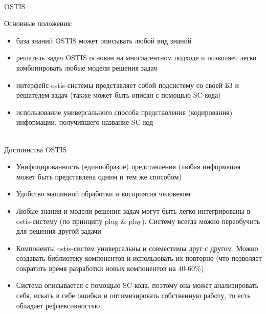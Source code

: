 \begin{frame}{\\OSTIS}
	\vspace{10mm}
	\begin{SCn}
	\vspace{3mm}
	Основные положения:
		\begin{itemize}
		\item база знаний OSTIS может описывать любой вид знаний
		\item решатель задач OSTIS основан на многоагентном подходе и позволяет легко комбинировать любые модели решения задач
		\item интерфейс ostis-системы представляет собой подсистему со своей БЗ и решателем задач (также может быть описан с помощью SC-кода)
		\item использование универсального способа представления (кодирования) информации, получившего название SC-код 
	\end{itemize}
	\end{SCn}
\end{frame}

\begin{frame}{\\Достоинства OSTIS}	
	\vspace{5mm}
	\begin{itemize}
		\item Унифицированность (единообразие) представления (любая информация может быть представлена одним и тем же способом)
		\item Удобство машинной обработки и восприятия человеком
		\item Любые знания и модели решения задач могут быть легко интегрированы в ostis-систему (по принципу plug \& play). Систему всегда можно переобучить для решения другой задачи
		\item Компоненты ostis-систем универсальны и совместимы друг с другом. Можно создавать библиотеку компонентов и использовать их повторно (что позволяет сократить время разработки новых компонентов на 40-60\%)
		\item Система описывается с помощью SC-кода, поэтому она может анализировать себя, искать в себе ошибки и оптимизировать собственную работу, то есть обладает рефлексивностью
	\end{itemize}
\end{frame}

